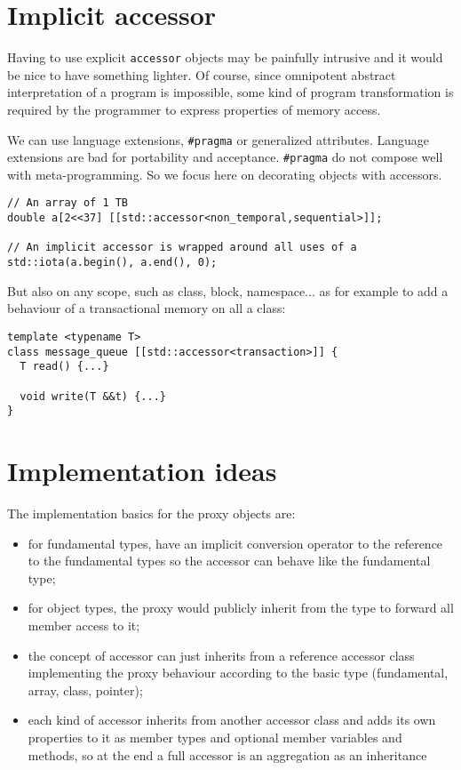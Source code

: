 \documentclass[a4paper]{article}
\begin{document}
\section{Implicit accessor}
\label{sec:implicit-accessor}

Having to use explicit \texttt{accessor} objects may be painfully
intrusive and it would be nice to have something lighter. Of course,
since omnipotent abstract interpretation of a program is impossible,
some kind of program transformation is required by the programmer to
express properties of memory access.

We can use language extensions, \lstinline|#pragma| or generalized
attributes. Language extensions are bad for portability and
acceptance. \lstinline|#pragma| do not compose well with
meta-programming. So we focus here on decorating objects with
accessors.

\begin{lstlisting}
// An array of 1 TB
double a[2<<37] [[std::accessor<non_temporal,sequential>]];

// An implicit accessor is wrapped around all uses of a
std::iota(a.begin(), a.end(), 0);
\end{lstlisting}

But also on any scope, such as class, block, namespace... as for
example to add a behaviour of a transactional memory on all a class:
\begin{lstlisting}
template <typename T>
class message_queue [[std::accessor<transaction>]] {
  T read() {...}

  void write(T &&t) {...}
}
\end{lstlisting}


\section{Implementation ideas}
\label{sec:implementation-ideas}

The implementation basics for the proxy objects are:
\begin{itemize}
\item for fundamental types, have an implicit conversion operator to
  the reference to the fundamental types so the accessor can behave
  like the fundamental type;
\item for object types, the proxy would publicly inherit from the type to
  forward all member access to it;
\item the concept of accessor can just inherits from a reference
  accessor class implementing the proxy behaviour according to the
  basic type (fundamental, array, class, pointer);
\item each kind of accessor inherits from another accessor class and
  adds its own properties to it as member types and optional member
  variables and methods, so at the end a full accessor is an
  aggregation as an inheritance 
\end{itemize}
\end{document}
